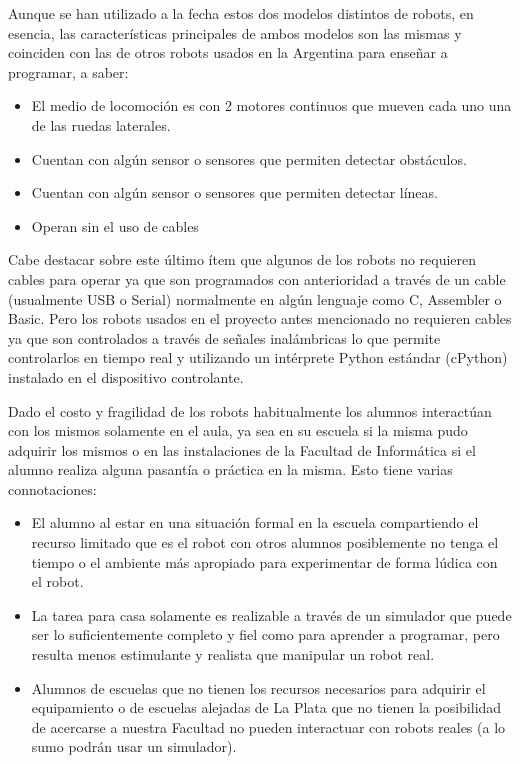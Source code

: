 Aunque se han utilizado a la fecha estos dos modelos distintos de robots,
en esencia, las características principales de ambos modelos son las mismas
y coinciden con las de otros robots usados en la Argentina para enseñar a
programar, a saber:
\begin{itemize}
    \item El medio de locomoción es con 2 motores continuos que mueven cada
        uno una de las ruedas laterales.
    \item Cuentan con algún sensor o sensores que permiten detectar obstáculos.
    \item Cuentan con algún sensor o sensores que permiten detectar líneas.
    \item Operan sin el uso de cables
\end{itemize}

Cabe destacar sobre este último ítem que algunos de los robots no requieren
cables para operar ya que son programados con anterioridad a través de un
cable (usualmente USB o Serial) normalmente en algún lenguaje como C, Assembler
o Basic. Pero los robots usados en el proyecto antes mencionado no requieren cables ya que son controlados a través de señales
inalámbricas lo que permite controlarlos en tiempo real y utilizando
un intérprete Python estándar (cPython) instalado en el dispositivo
controlante.

Dado el costo y fragilidad de los robots habitualmente los alumnos interactúan
con los mismos solamente en el aula, ya sea en su escuela si la misma pudo adquirir los mismos o en las instalaciones de la  Facultad de Informática si el alumno
realiza alguna pasantía o práctica en la misma. Esto tiene varias connotaciones:
\begin{itemize}
    \item El alumno al estar en una situación formal en la escuela
        compartiendo el recurso limitado que es el robot con otros
        alumnos posiblemente no tenga el tiempo o el ambiente más apropiado
        para experimentar de forma lúdica con el robot.
    \item La tarea para casa solamente es realizable a través de un simulador
        que puede ser lo suficientemente completo y fiel como para aprender
        a programar, pero resulta menos estimulante y realista que manipular
        un robot real.
    \item Alumnos de escuelas que no tienen los recursos necesarios para
        adquirir el equipamiento o de escuelas alejadas de La Plata que
        no tienen la posibilidad de acercarse a nuestra
        Facultad no pueden interactuar con robots reales
        (a lo sumo podrán usar un simulador).
\end{itemize}


